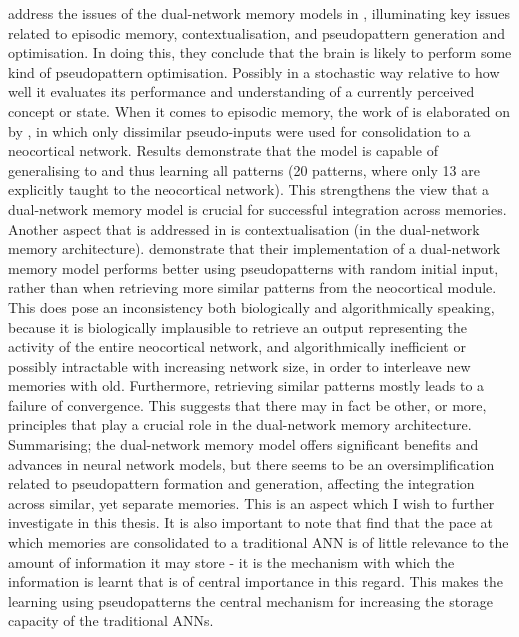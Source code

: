 \cite{French2001} address the issues of the dual-network memory models in \citep{French1997, Ans1997}, illuminating key issues related to episodic memory, contextualisation, and pseudopattern generation and optimisation. In doing this, they conclude that the brain is likely to perform some kind of pseudopattern optimisation. Possibly in a stochastic way relative to how well it evaluates its performance and understanding of a currently perceived concept or state. When it comes to episodic memory, the work of \cite{Ans2000} is elaborated on by \cite{French2001}, in which only dissimilar pseudo-inputs were used for consolidation to a neocortical network. Results demonstrate that the model is capable of generalising to and thus learning all patterns (20 patterns, where only 13 are explicitly taught to the neocortical network). This strengthens the view that a dual-network memory model is crucial for successful integration across memories. Another aspect that is addressed in \citep{French2001} is contextualisation (in the dual-network memory architecture). \cite{Ans2000} demonstrate that their implementation of a dual-network memory model performs better using pseudopatterns with random initial input, rather than when retrieving more similar patterns from the neocortical module. This does pose an inconsistency both biologically and algorithmically speaking, because it is biologically implausible to retrieve an output representing the activity of the entire neocortical network, and algorithmically inefficient or possibly intractable with increasing network size, in order to interleave new memories with old. Furthermore, retrieving similar patterns mostly leads to a failure of convergence. This suggests that there may in fact be other, or more, principles that play a crucial role in the dual-network memory architecture. Summarising; the dual-network memory model offers significant benefits and advances in neural network models, but there seems to be an oversimplification related to pseudopattern formation and generation, affecting the integration across similar, yet separate memories. This is an aspect which I wish to further investigate in this thesis.
It is also important to note that \cite{French2001} find that the pace at which memories are consolidated to a traditional ANN is of little relevance to the amount of information it may store - it is the mechanism with which the information is learnt that is of central importance in this regard. This makes the learning using pseudopatterns the central mechanism for increasing the storage capacity of the traditional ANNs.

